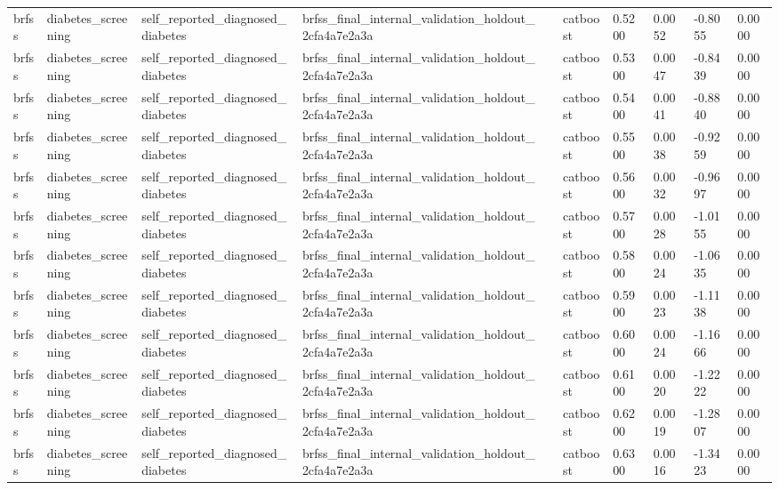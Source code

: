 \begin{tabular}{llllllllll}
brfss & diabetes\_screening & self\_reported\_diagnosed\_diabetes & brfss\_final\_internal\_validation\_holdout\_2cfa4a7e2a3a &  & catboost & 0.5200 & 0.0052 & -0.8055 & 0.0000 \\
brfss & diabetes\_screening & self\_reported\_diagnosed\_diabetes & brfss\_final\_internal\_validation\_holdout\_2cfa4a7e2a3a &  & catboost & 0.5300 & 0.0047 & -0.8439 & 0.0000 \\
brfss & diabetes\_screening & self\_reported\_diagnosed\_diabetes & brfss\_final\_internal\_validation\_holdout\_2cfa4a7e2a3a &  & catboost & 0.5400 & 0.0041 & -0.8840 & 0.0000 \\
brfss & diabetes\_screening & self\_reported\_diagnosed\_diabetes & brfss\_final\_internal\_validation\_holdout\_2cfa4a7e2a3a &  & catboost & 0.5500 & 0.0038 & -0.9259 & 0.0000 \\
brfss & diabetes\_screening & self\_reported\_diagnosed\_diabetes & brfss\_final\_internal\_validation\_holdout\_2cfa4a7e2a3a &  & catboost & 0.5600 & 0.0032 & -0.9697 & 0.0000 \\
brfss & diabetes\_screening & self\_reported\_diagnosed\_diabetes & brfss\_final\_internal\_validation\_holdout\_2cfa4a7e2a3a &  & catboost & 0.5700 & 0.0028 & -1.0155 & 0.0000 \\
brfss & diabetes\_screening & self\_reported\_diagnosed\_diabetes & brfss\_final\_internal\_validation\_holdout\_2cfa4a7e2a3a &  & catboost & 0.5800 & 0.0024 & -1.0635 & 0.0000 \\
brfss & diabetes\_screening & self\_reported\_diagnosed\_diabetes & brfss\_final\_internal\_validation\_holdout\_2cfa4a7e2a3a &  & catboost & 0.5900 & 0.0023 & -1.1138 & 0.0000 \\
brfss & diabetes\_screening & self\_reported\_diagnosed\_diabetes & brfss\_final\_internal\_validation\_holdout\_2cfa4a7e2a3a &  & catboost & 0.6000 & 0.0024 & -1.1666 & 0.0000 \\
brfss & diabetes\_screening & self\_reported\_diagnosed\_diabetes & brfss\_final\_internal\_validation\_holdout\_2cfa4a7e2a3a &  & catboost & 0.6100 & 0.0020 & -1.2222 & 0.0000 \\
brfss & diabetes\_screening & self\_reported\_diagnosed\_diabetes & brfss\_final\_internal\_validation\_holdout\_2cfa4a7e2a3a &  & catboost & 0.6200 & 0.0019 & -1.2807 & 0.0000 \\
brfss & diabetes\_screening & self\_reported\_diagnosed\_diabetes & brfss\_final\_internal\_validation\_holdout\_2cfa4a7e2a3a &  & catboost & 0.6300 & 0.0016 & -1.3423 & 0.0000 \\

\end{tabular}
